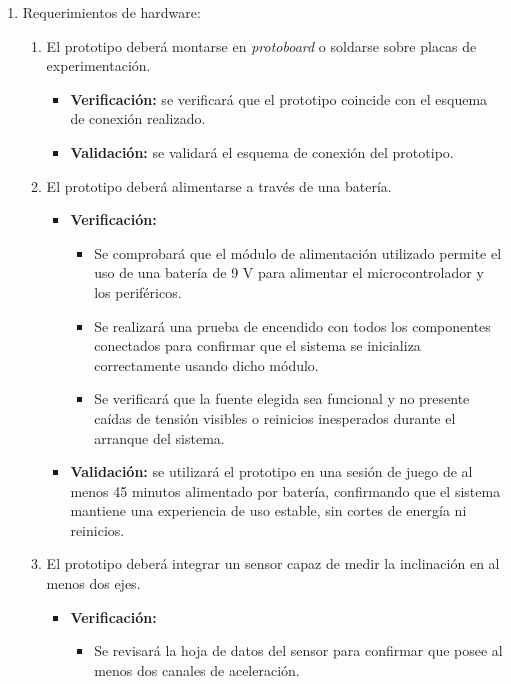 \documentclass[
11pt, %
]{charter}
\begin{document}
\begin{enumerate}
	\item Requerimientos de hardware:
	\begin{enumerate}
		\item El prototipo deberá montarse en \textit{protoboard} o soldarse sobre placas de experimentación. %
		\begin{itemize}
			\item \textbf{Verificación:} se verificará que el prototipo coincide con el esquema de conexión realizado.
			\item \textbf{Validación:} se validará el esquema de conexión del prototipo.
		\end{itemize}
		\item El prototipo deberá alimentarse a través de una batería. %
		\begin{itemize}
			\item \textbf{Verificación:} 
			\begin{itemize}
				\item Se comprobará que el módulo de alimentación utilizado permite el uso de una batería de 9 V para alimentar el microcontrolador y los periféricos.                                     
				\item Se realizará una prueba de encendido con todos los componentes conectados para confirmar que el sistema se inicializa correctamente usando dicho módulo.                                     
				\item Se verificará que la fuente elegida sea funcional y no presente caídas de tensión visibles o reinicios inesperados durante el arranque del sistema.
			\end{itemize}
			\item \textbf{Validación:} se utilizará el prototipo en una sesión de juego de al menos 45 minutos alimentado por batería, confirmando que el sistema mantiene una experiencia de uso estable, sin cortes de energía ni reinicios.
		\end{itemize}		
		\item El prototipo deberá integrar un sensor capaz de medir la inclinación en al menos dos ejes. %
		\begin{itemize}
			\item \textbf{Verificación:} 
			\begin{itemize}
				\item Se revisará la hoja de datos del sensor para confirmar que posee al menos dos canales de aceleración.                                     

\end{itemize}
\end{itemize}
\end{enumerate}
\end{enumerate}
\end{document}
